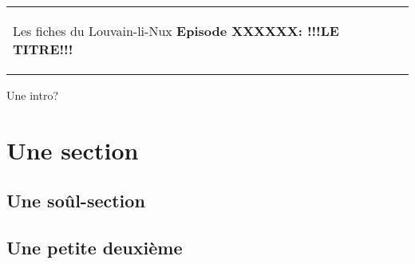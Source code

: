 



\begin{tabular}{p{14cm}r}
	\begin{center}{\Large Les fiches du Louvain-li-Nux\linebreak \linebreak
	\LARGE \textbf{Episode XXXXXX: !!!LE TITRE!!!}}\end{center}
		&
	\usebox{\logollnux}
\end{tabular}

Une intro?

\section*{Une section}

\subsection*{Une soûl-section}

\subsection*{Une petite deuxième}
                                                                                                                   

